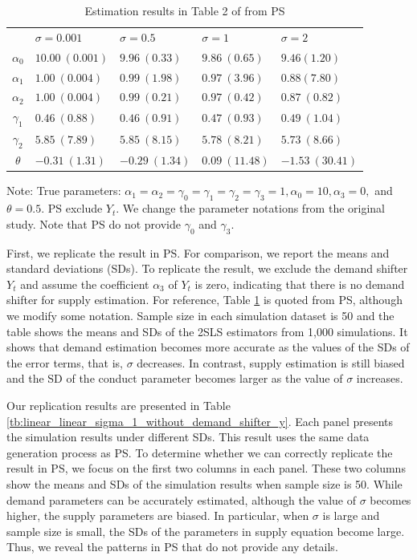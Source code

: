 \documentclass[11pt, a4paper]{article}
\begin{document}
\begin{table}[!htbp]
    \caption{Estimation results in Table 2 of from PS}
    \label{tb:linear_linear_sigma_Perloff_Shen}
    \begin{center}
        \begin{tabular}{cllll}
            \hline
            & $\sigma=0.001$ & $\sigma=0.5$ & $\sigma=1$ & $\sigma=2$ \\
            $\alpha_0$ & $10.00\ (0.001)$ & $9.96\ (0.33)$ & $9.86\ (0.65)$ & $9.46 (1.20)$ \\
            $\alpha_1$ & $1.00\ (0.004)$ & $0.99\ (1.98)$ & $0.97\ (3.96)$ & $0.88 (7.80)$ \\
            $\alpha_2$ & $1.00\ (0.004)$ & $0.99\ (0.21)$ & $0.97\ (0.42)$ & $0.87\ (0.82)$ \\
            $\gamma_1$ & $0.46\ (0.88)$ & $0.46\ (0.91)$ & $0.47\ (0.93)$ & $0.49\ (1.04)$ \\
            $\gamma_2$ & $5.85\ (7.89)$ & $5.85\ (8.15)$ & $5.78\ (8.21)$ & $5.73\ (8.66)$ \\
            $\theta$ & $-0.31\ (1.31)$ & $-0.29\ (1.34)$ & $0.09\ (11.48)$ & $-1.53\ (30.41)$ \\
            \hline
        \end{tabular}
    \end{center}\footnotesize
    Note: True parameters: $\alpha_1 = \alpha_2 = \gamma_0 = \gamma_1 = \gamma_2  = \gamma_3 = 1, \alpha_0 = 10, \alpha_3 = 0,$ and $\theta = 0.5$. PS exclude $Y_t$. We change the parameter notations from the original study. Note that PS do not provide $\gamma_0$ and $\gamma_3$.
\end{table}

First, we replicate the result in PS. For comparison, we report the means and standard deviations (SDs).
To replicate the result, we exclude the demand shifter $Y_t$ and assume the coefficient $\alpha_3$ of $Y_t$ is zero, indicating that there is no demand shifter for supply estimation.
For reference, Table \ref{tb:linear_linear_sigma_Perloff_Shen} is quoted from PS, although we modify some notation.
Sample size in each simulation dataset is 50 and the table shows the means and SDs of the 2SLS estimators from 1,000 simulations.
It shows that demand estimation becomes more accurate as the values of the SDs of the error terms, that is, $\sigma$ decreases.
In contrast, supply estimation is still biased and the SD of the conduct parameter becomes larger as the value of $\sigma$ increases.

Our replication results are presented in Table \ref{tb:linear_linear_sigma_1_without_demand_shifter_y}.
Each panel presents the simulation results under different SDs.
This result uses the same data generation process as PS. 
To determine whether we can correctly replicate the result in PS, we focus on the first two columns in each panel.
These two columns show the means and SDs of the simulation results when sample size is 50.
While demand parameters can be accurately estimated, although the value of $\sigma$ becomes higher, the supply parameters are biased.
In particular, when $\sigma$ is large and sample size is small, the SDs of the parameters in supply equation become large.
Thus, we reveal the patterns in PS that do not provide any details.
\end{document}
